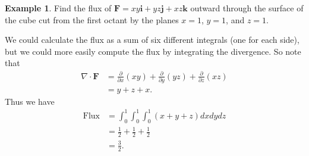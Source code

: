 \documentclass[12pt, letter]{article}
\theoremstyle{plain}
\numberwithin{theorem}{section}
\theoremstyle{definition}
\newtheorem{example}[theorem]{Example}
\begin{document}
\begin{example}
Find the flux of $\bm{F}=xy\bm{i}+yz\bm{j}+xz\bm{k}$ outward through the surface of the cube cut from the first octant by the planes $x=1$, $y=1$, and $z=1$.

\bigskip

We could calculate the flux as a sum of six different integrals (one for each side), but we could more easily compute the flux by integrating the divergence. So note that
\begin{align*}
\nabla \cdot \bm{F} &= \frac{\partial}{\partial x}(xy)+\frac{\partial}{\partial y}(yz)+\frac{\partial}{\partial z}(xz)\\
&= y+z+x.
\end{align*}
Thus we have
\begin{align*}
\text{Flux} &= \int_0^1\int_0^1\int_0^1 (x+y+z)dxdydz\\
&= \frac{1}{2}+\frac{1}{2}+\frac{1}{2}\\
&= \frac{3}{2}.
\end{align*}
\end{example}

\bigskip

\hrulefill

\bigskip
\end{document}

